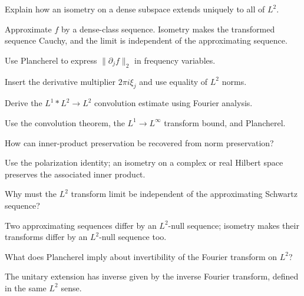 \begin{problem}\label{prob:iii13-problem-02}
Explain how an isometry on a dense subspace extends uniquely to all of \(L^2\).
\end{problem}
\begin{solution}
Approximate \(f\) by a dense-class sequence. Isometry makes the transformed
sequence Cauchy, and the limit is independent of the approximating sequence.
\end{solution}

\begin{problem}\label{prob:iii13-problem-03}
Use Plancherel to express \(\|\partial_jf\|_2\) in frequency variables.
\end{problem}
\begin{solution}
Insert the derivative multiplier \(2\pi i\xi_j\) and use equality of
\(L^2\) norms.
\end{solution}

\begin{problem}\label{prob:iii13-problem-04}
Derive the \(L^1*L^2\to L^2\) convolution estimate using Fourier analysis.
\end{problem}
\begin{solution}
Use the convolution theorem, the \(L^1\to L^\infty\) transform bound, and
Plancherel.
\end{solution}

\begin{problem}\label{prob:iii13-problem-05}
How can inner-product preservation be recovered from norm preservation?
\end{problem}
\begin{solution}
Use the polarization identity; an isometry on a complex or real Hilbert
space preserves the associated inner product.
\end{solution}

\begin{problem}\label{prob:iii13-problem-06}
Why must the \(L^2\) transform limit be independent of the approximating Schwartz sequence?
\end{problem}
\begin{solution}
Two approximating sequences differ by an \(L^2\)-null sequence; isometry
makes their transforms differ by an \(L^2\)-null sequence too.
\end{solution}

\begin{problem}\label{prob:iii13-problem-07}
What does Plancherel imply about invertibility of the Fourier transform on \(L^2\)?
\end{problem}
\begin{solution}
The unitary extension has inverse given by the inverse Fourier transform,
defined in the same \(L^2\) sense.
\end{solution}

